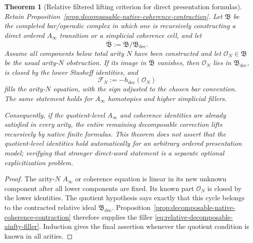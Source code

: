 \documentclass[11pt]{article}
\newtheorem{theorem}{Theorem}[section]
\theoremstyle{definition}
\begin{document}
\begin{theorem}[Relative filtered lifting criterion for direct presentation formulas]\label{thm:relative-decomposable-ainfty-lifting}
Retain Proposition~\ref{prop:decomposable-native-coherence-contraction}.  Let
$\mathfrak B$ be the completed bar/operadic complex in which one is recursively
constructing a direct ordered $A_\infty$ transition or a simplicial coherence
cell, and let
\[
 \overline{\mathfrak B}:=\mathfrak B/\mathfrak B_{\mathrm{dec}}.
\]
Assume all components below total arity $N$ have been constructed and let
$\mathcal O_N\in\mathfrak B$ be the usual arity-$N$ obstruction.  If its image
in $\overline{\mathfrak B}$ vanishes, then $\mathcal O_N$ lies in
$\mathfrak B_{\mathrm{dec}}$, is closed by the lower Stasheff identities, and
\begin{equation}\label{eq:relative-decomposable-ainfty-filler}
 \mathcal F_N:=-h_{\mathrm{dec}}(\mathcal O_N)
\end{equation}
fills the arity-$N$ equation, with the sign adjusted to the chosen bar
convention.  The same statement holds for $A_\infty$ homotopies and higher
simplicial fillers.

Consequently, if the quotient-level $A_\infty$ and coherence identities are
already satisfied in every arity, the entire remaining decomposable correction
lifts recursively by native finite formulas.  This theorem does \emph{not}
assert that the quotient-level identities hold automatically for an arbitrary
ordered presentation model; verifying that stronger direct-word statement is a
separate optional explicitization problem.
\end{theorem}

\begin{proof}
The arity-$N$ $A_\infty$ or coherence equation is linear in its new unknown
component after all lower components are fixed.  Its known part
$\mathcal O_N$ is closed by the lower identities.  The quotient hypothesis says
exactly that this cycle belongs to the contracted relative ideal
$\mathfrak B_{\mathrm{dec}}$.  Proposition~\ref{prop:decomposable-native-coherence-contraction}
therefore supplies the filler \eqref{eq:relative-decomposable-ainfty-filler}.
Induction gives the final assertion whenever the quotient condition is known in
all arities.
\end{proof}
\end{document}
